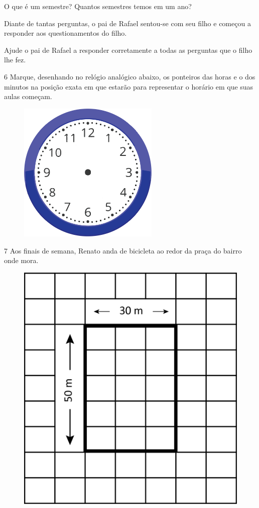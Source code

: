 O que é um semestre? 
Quantos semestres temos em um ano?

Diante de tantas perguntas, o pai de Rafael sentou-se com seu filho e
começou a responder aos questionamentos do filho.

Ajude o pai de Rafael a responder corretamente a todas as perguntas que o filho lhe fez.

\num{6} Marque, desenhando no relógio analógico abaixo, os ponteiros das horas e o dos
minutos na posição exata em que estarão para representar o horário em que
suas aulas começam.

\begin{figure}[htpb!]
\centering
\includegraphics[width=0.6\textwidth]{./media/image54b.png}
\end{figure}


\pagebreak

\num{7} Aos finais de semana, Renato anda de bicicleta ao redor da praça do bairro onde mora.

\begin{figure}[htpb!]
\centering
\includegraphics[width=.4\textwidth]{./media/image55.png}
\end{figure}


